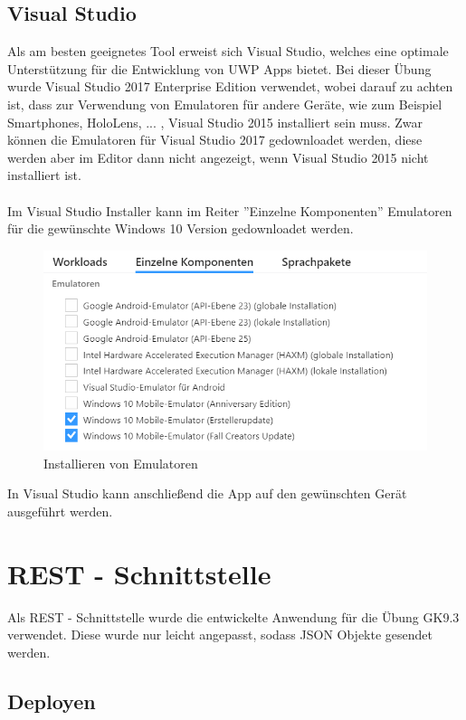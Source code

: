 \subsection{Visual Studio}

Als am besten geeignetes Tool erweist sich Visual Studio, welches eine optimale Unterstützung für die Entwicklung von UWP Apps bietet. Bei dieser Übung wurde Visual Studio 2017 Enterprise Edition verwendet, wobei darauf zu achten ist, dass zur Verwendung von Emulatoren für andere Geräte, wie zum Beispiel Smartphones, HoloLens, ... , Visual Studio 2015 installiert sein muss. Zwar können die Emulatoren für Visual Studio 2017 gedownloadet werden, diese werden aber im Editor dann nicht angezeigt, wenn Visual Studio 2015 nicht installiert ist.
\\\\
Im Visual Studio Installer kann im Reiter ''Einzelne Komponenten'' Emulatoren für die gewünschte Windows 10 Version gedownloadet werden.

\begin{figure}[H]
	\centering
	\includegraphics[width=0.7\linewidth]{images/screenshot002}
	\caption{Installieren von Emulatoren}
	\label{fig:screenshot002}
\end{figure}

In Visual Studio kann anschließend die App auf den gewünschten Gerät ausgeführt werden.

\section{REST - Schnittstelle}

Als REST - Schnittstelle wurde die entwickelte Anwendung für die Übung GK9.3 verwendet. Diese wurde nur leicht angepasst, sodass JSON Objekte gesendet werden.

\subsection{Deployen}

